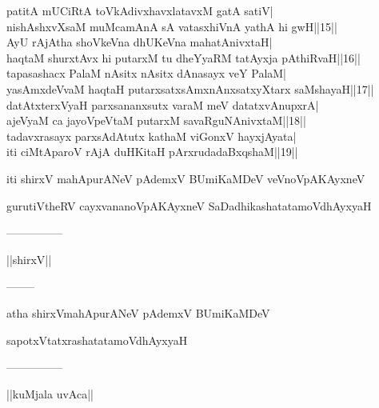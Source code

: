 \documentclass{article}
\begin{document}
patitA mUCiRtA toVkAdivxhavxlatavxM gatA satiV|\\
nishAshxvXsaM muMcamAnA sA vatasxhiVnA yathA hi gwH||15||\\
AyU rAjAtha shoVkeVna dhUKeVna mahatAnivxtaH|\\
haqtaM shurxtAvx hi putarxM tu dheYyaRM tatAyxja pAthiRvaH||16||\\
tapasashacx PalaM nAsitx nAsitx dAnasayx veY PalaM|\\
yasAmxdeVvaM haqtaH putarxsatxsAmxnAnxsatxyXtarx saMshayaH||17||\\
datAtxterxVyaH parxsananxsutx varaM meV datatxvAnupxrA|\\
ajeVyaM ca jayoVpeVtaM putarxM savaRguNAnivxtaM||18||\\
tadavxrasayx parxsAdAtutx kathaM viGonxV hayxjAyata|\\
iti ciMtAparoV rAjA duHKitaH pArxrudadaBxqshaM||19||

\begin{center}
iti shirxV mahApurANeV pAdemxV BUmiKaMDeV veVnoVpAKAyxneV
\end{center}

\begin{center}
gurutiVtheRV cayxvananoVpAKAyxneV SaDadhikashatatamoVdhAyxyaH
\end{center}

\begin{center}
---------------
\end{center}

\begin{center}
||shirxV||
\end{center}

\begin{center}
--------
\end{center}

\begin{center}
atha shirxVmahApurANeV pAdemxV BUmiKaMDeV
\end{center}

\begin{center}
sapotxVtatxrashatatamoVdhAyxyaH
\end{center}

\begin{center}
---------------
\end{center}

\begin{center}
||kuMjala uvAca||
\end{center}
\end{document}
